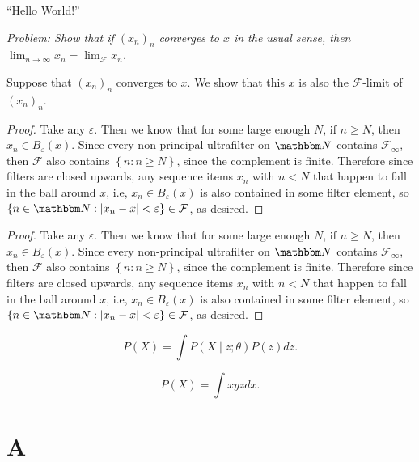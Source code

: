 \documentclass[11pt]{article}
\begin{document}
``Hello World!''

\textit{Problem: Show that if $(x_n)_n$ converges to $x$ in the usual sense, then
$\lim_{n \to \infty} x_n = \lim_{\mathcal{F}} x_n$.}

Suppose that $(x_n)_n$ converges to $x$. We show that this $x$ is also the
$\mathcal{F}$-limit of $(x_n)_n$.

\begin{proof}
Take any $\varepsilon$. Then we know that for some large enough $N$, if $n \geq N$, then
$x_n \in B_\varepsilon(x)$. Since every non-principal ultrafilter on $\N$ contains
$\mathcal{F}_\infty$, then $\mathcal{F}$ also contains $ \left\{ n : n \geq N \right\} $,
since the complement is finite. Therefore since filters are closed upwards, any
sequence items $x_n$ with $n < N$ that happen to fall in the ball around $x$, i.e, $x_n \in B_\varepsilon(x)$
is also contained in some filter element, so $\left\{  n \in \N : \lvert x_n - x \rvert < \varepsilon \right\} \in \mathcal{F}$, as desired.

\end{proof}

\begin{proof}
    Take any $\varepsilon$. Then we know that for some large enough $N$, if $n \geq N$, then
    $x_n \in B_\varepsilon(x)$. Since every non-principal ultrafilter on $\N$ contains
    $\mathcal{F}_\infty$, then $\mathcal{F}$ also contains $ \left\{ n : n \geq N \right\} $,
    since the complement is finite. Therefore since filters are closed upwards, any
    sequence items $x_n$ with $n < N$ that happen to fall in the ball around $x$,
    i.e, $x_n \in B_\varepsilon(x)$
    is also contained in some filter element, so 
    $\left\{  n \in \N : \lvert x_n - x \rvert < \varepsilon \right\} \in \mathcal{F}$,
    as desired. \qedhere

\end{proof}

$$P(X) = \int P(X \mid z; \theta) P(z) dz.$$

$$P(X) = \int xyz dx.$$

\section{A}

\end{document}
